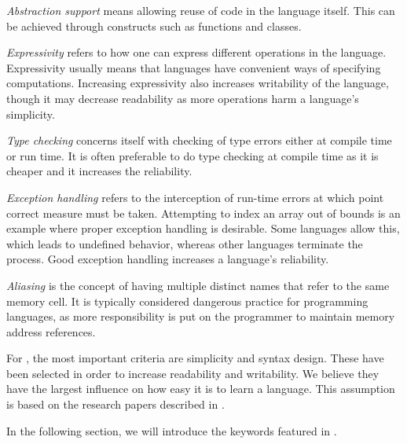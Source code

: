 \textit{Abstraction support} means allowing reuse of code in the language itself. 
This can be achieved through constructs such as functions and classes.

\textit{Expressivity} refers to how one can express different operations in the language.
Expressivity usually means that languages have convenient ways of specifying computations. 
Increasing expressivity also increases writability of the language, though it may decrease readability as more operations harm a language's simplicity.
 
\textit{Type checking} concerns itself with checking of type errors either at compile time or run time. 
It is often preferable to do type checking at compile time as it is cheaper and it increases the reliability.

\textit{Exception handling} refers to the interception of run-time errors at which point correct measure must be taken. 
Attempting to index an array out of bounds is an example where proper exception handling is desirable.
Some languages allow this, which leads to undefined behavior, whereas other languages terminate the process.
Good exception handling increases a language's reliability.

\textit{Aliasing} is the concept of having multiple distinct names that refer to the same memory cell. 
It is typically considered dangerous practice for programming languages, as more responsibility is put on the programmer to maintain memory address references.

For \dazel{}, the most important criteria are simplicity and syntax design.
These have been selected in order to increase readability and writability. 
We believe they have the largest influence on how easy it is to learn a language.
This assumption is based on the research papers described in .

In the following section, we will introduce the keywords featured in \dazel{}.